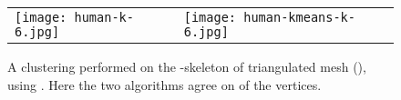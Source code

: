 \documentclass[11pt]{article}
\theoremstyle{plain}
\begin{document}
\begin{figure}
\begin{center}
\begin{tabular}{ll}
\texttt{[image: human-k-6.jpg]} &
\texttt{[image: human-kmeans-k-6.jpg]} \\
\end{tabular}
\end{center}
\caption{A  clustering performed on the -skeleton of triangulated mesh
(), using . Here the two algorithms agree
on  of the vertices.}
\label{experiment3}
\end{figure}
\end{document}

